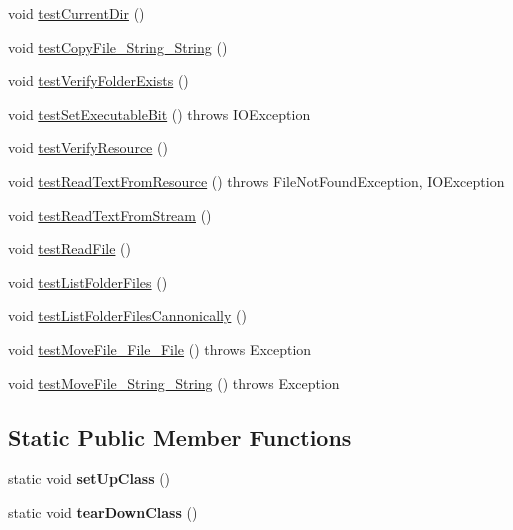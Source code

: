 \begin{DoxyCompactItemize}
\item 
void \hyperlink{classCASUAL_1_1FileOperationsTest_ade3db71a22f802b35dda0719144a1f1f}{test\-Current\-Dir} ()
\item 
void \hyperlink{classCASUAL_1_1FileOperationsTest_ac2121be1cb1c4b29e06316d02dcfdc8e}{test\-Copy\-File\-\_\-\-String\-\_\-\-String} ()
\item 
void \hyperlink{classCASUAL_1_1FileOperationsTest_a473ff930a9df1b0ff720742493326dd4}{test\-Verify\-Folder\-Exists} ()
\item 
void \hyperlink{classCASUAL_1_1FileOperationsTest_af16a656363227430df9f44f73d7919c3}{test\-Set\-Executable\-Bit} ()  throws I\-O\-Exception 
\item 
void \hyperlink{classCASUAL_1_1FileOperationsTest_a0233125978104bbfb45cd27122d3fe75}{test\-Verify\-Resource} ()
\item 
void \hyperlink{classCASUAL_1_1FileOperationsTest_ae1454635ca7d34ee0a45fc8123e31f08}{test\-Read\-Text\-From\-Resource} ()  throws File\-Not\-Found\-Exception, I\-O\-Exception 
\item 
void \hyperlink{classCASUAL_1_1FileOperationsTest_a74b229a643c8e580138dd481ed0ac761}{test\-Read\-Text\-From\-Stream} ()
\item 
void \hyperlink{classCASUAL_1_1FileOperationsTest_aa271380060ef566d10799e9f8a1030e4}{test\-Read\-File} ()
\item 
void \hyperlink{classCASUAL_1_1FileOperationsTest_a322d0b0b74ec95e02e071d9cbd76b7cf}{test\-List\-Folder\-Files} ()
\item 
void \hyperlink{classCASUAL_1_1FileOperationsTest_a6f9395b88c03263c4f168543d5e0f1f6}{test\-List\-Folder\-Files\-Cannonically} ()
\item 
void \hyperlink{classCASUAL_1_1FileOperationsTest_a800ab0b35acd5da573c382bd05dc6be0}{test\-Move\-File\-\_\-\-File\-\_\-\-File} ()  throws Exception 
\item 
void \hyperlink{classCASUAL_1_1FileOperationsTest_a88880f23fba5c107cba6f67f5613b1df}{test\-Move\-File\-\_\-\-String\-\_\-\-String} ()  throws Exception 
\end{DoxyCompactItemize}
\subsection*{Static Public Member Functions}
\begin{DoxyCompactItemize}
\item 
\hypertarget{classCASUAL_1_1FileOperationsTest_a1230985a70e8a8df7e0eb18e3a3ec6e7}{static void {\bfseries set\-Up\-Class} ()}\label{classCASUAL_1_1FileOperationsTest_a1230985a70e8a8df7e0eb18e3a3ec6e7}

\item 
\hypertarget{classCASUAL_1_1FileOperationsTest_a6b190882b64a43ce262cb891f4958a66}{static void {\bfseries tear\-Down\-Class} ()}\label{classCASUAL_1_1FileOperationsTest_a6b190882b64a43ce262cb891f4958a66}

\end{DoxyCompactItemize}


